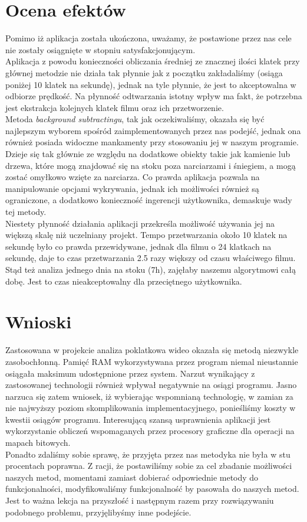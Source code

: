 \documentclass[a4paper]{article}
\begin{document}
\section{Ocena efektów}
Pomimo iż aplikacja została ukończona, uważamy, że postawione przez nas cele nie zostały osiągnięte w stopniu satysfakcjonującym.\\
Aplikacja z powodu konieczności obliczania średniej ze znacznej ilości klatek  przy głównej metodzie nie działa tak płynnie jak z początku zakładaliśmy (osiąga poniżej 10 klatek na sekundę), jednak na tyle płynnie, że jest to akceptowalna w odbiorze prędkość. Na płynność odtwarzania istotny wpływ ma fakt, że potrzebna jest ekstrakcja kolejnych klatek filmu oraz ich przetworzenie.\\
Metoda \textit{background subtractingu}, tak jak oczekiwaliśmy, okazała się  być najlepszym wyborem spośród zaimplementowanych przez nas podejść, jednak ona również posiada widoczne mankamenty przy stosowaniu jej w naszym programie. Dzieje się tak głównie ze względu na dodatkowe obiekty takie jak kamienie lub drzewa, które mogą znajdować się na stoku poza narciarzami i śniegiem, a mogą zostać omyłkowo wzięte za narciarza. Co prawda aplikacja pozwala na manipulowanie opcjami wykrywania, jednak ich możliwości również są ograniczone, a dodatkowo konieczność ingerencji użytkownika, demaskuje wady tej metody.\\
Niestety płynność działania aplikacji przekreśla możliwość używania jej na większą skalę niż uczelniany projekt. Tempo przetwarzania około 10 klatek na sekundę było co prawda przewidywane, jednak dla filmu o 24 klatkach na sekundę, daje to czas przetwarzania 2.5 razy większy od czasu właściwego filmu. Stąd też analiza jednego dnia na stoku (7h), zajęłaby naszemu algorytmowi całą dobę. Jest to czas nieakceptowalny dla przeciętnego użytkownika.

\section{Wnioski}
Zastosowana w projekcie analiza poklatkowa wideo okazała się metodą niezwykle zasobochłonną. Pamięć RAM wykorzystywana przez program niemal nieustannie osiągała maksimum udostępnione przez system. Narzut wynikający z zastosowanej technologii również wpływał negatywnie na osiągi programu. Jasno narzuca się zatem wniosek, iż wybierając wspomnianą technologię, w zamian za nie najwyższy poziom skomplikowania implementacyjnego, ponieśliśmy koszty w kwestii osiągów programu. Interesującą szansą usprawnienia aplikacji jest wykorzystanie obliczeń wspomaganych przez procesory graficzne dla operacji na mapach bitowych.\\
Ponadto zdaliśmy sobie sprawę, że przyjęta przez nas metodyka nie była w stu procentach poprawna. Z racji, że postawiliśmy sobie za cel zbadanie możliwości naszych metod, momentami zamiast dobierać odpowiednie metody do funkcjonalności, modyfikowaliśmy funkcjonalność by pasowała do naszych metod. Jest to ważna lekcja na przyszłość i następnym razem przy rozwiązywaniu podobnego problemu, przyjęlibyśmy inne podejście.
\end{document}
